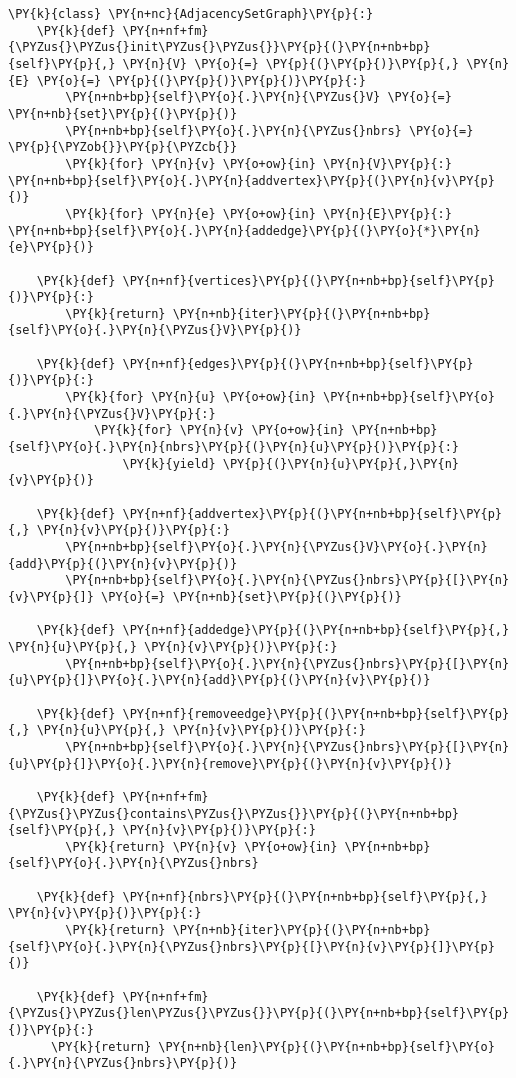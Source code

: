 \begin{Verbatim}[commandchars=\\\{\}]
\PY{k}{class} \PY{n+nc}{AdjacencySetGraph}\PY{p}{:}
    \PY{k}{def} \PY{n+nf+fm}{\PYZus{}\PYZus{}init\PYZus{}\PYZus{}}\PY{p}{(}\PY{n+nb+bp}{self}\PY{p}{,} \PY{n}{V} \PY{o}{=} \PY{p}{(}\PY{p}{)}\PY{p}{,} \PY{n}{E} \PY{o}{=} \PY{p}{(}\PY{p}{)}\PY{p}{)}\PY{p}{:}
        \PY{n+nb+bp}{self}\PY{o}{.}\PY{n}{\PYZus{}V} \PY{o}{=} \PY{n+nb}{set}\PY{p}{(}\PY{p}{)}
        \PY{n+nb+bp}{self}\PY{o}{.}\PY{n}{\PYZus{}nbrs} \PY{o}{=} \PY{p}{\PYZob{}}\PY{p}{\PYZcb{}}
        \PY{k}{for} \PY{n}{v} \PY{o+ow}{in} \PY{n}{V}\PY{p}{:} \PY{n+nb+bp}{self}\PY{o}{.}\PY{n}{addvertex}\PY{p}{(}\PY{n}{v}\PY{p}{)}
        \PY{k}{for} \PY{n}{e} \PY{o+ow}{in} \PY{n}{E}\PY{p}{:} \PY{n+nb+bp}{self}\PY{o}{.}\PY{n}{addedge}\PY{p}{(}\PY{o}{*}\PY{n}{e}\PY{p}{)}

    \PY{k}{def} \PY{n+nf}{vertices}\PY{p}{(}\PY{n+nb+bp}{self}\PY{p}{)}\PY{p}{:}
        \PY{k}{return} \PY{n+nb}{iter}\PY{p}{(}\PY{n+nb+bp}{self}\PY{o}{.}\PY{n}{\PYZus{}V}\PY{p}{)}

    \PY{k}{def} \PY{n+nf}{edges}\PY{p}{(}\PY{n+nb+bp}{self}\PY{p}{)}\PY{p}{:}
        \PY{k}{for} \PY{n}{u} \PY{o+ow}{in} \PY{n+nb+bp}{self}\PY{o}{.}\PY{n}{\PYZus{}V}\PY{p}{:}
            \PY{k}{for} \PY{n}{v} \PY{o+ow}{in} \PY{n+nb+bp}{self}\PY{o}{.}\PY{n}{nbrs}\PY{p}{(}\PY{n}{u}\PY{p}{)}\PY{p}{:}
                \PY{k}{yield} \PY{p}{(}\PY{n}{u}\PY{p}{,}\PY{n}{v}\PY{p}{)}

    \PY{k}{def} \PY{n+nf}{addvertex}\PY{p}{(}\PY{n+nb+bp}{self}\PY{p}{,} \PY{n}{v}\PY{p}{)}\PY{p}{:}
        \PY{n+nb+bp}{self}\PY{o}{.}\PY{n}{\PYZus{}V}\PY{o}{.}\PY{n}{add}\PY{p}{(}\PY{n}{v}\PY{p}{)}
        \PY{n+nb+bp}{self}\PY{o}{.}\PY{n}{\PYZus{}nbrs}\PY{p}{[}\PY{n}{v}\PY{p}{]} \PY{o}{=} \PY{n+nb}{set}\PY{p}{(}\PY{p}{)}

    \PY{k}{def} \PY{n+nf}{addedge}\PY{p}{(}\PY{n+nb+bp}{self}\PY{p}{,} \PY{n}{u}\PY{p}{,} \PY{n}{v}\PY{p}{)}\PY{p}{:}
        \PY{n+nb+bp}{self}\PY{o}{.}\PY{n}{\PYZus{}nbrs}\PY{p}{[}\PY{n}{u}\PY{p}{]}\PY{o}{.}\PY{n}{add}\PY{p}{(}\PY{n}{v}\PY{p}{)}

    \PY{k}{def} \PY{n+nf}{removeedge}\PY{p}{(}\PY{n+nb+bp}{self}\PY{p}{,} \PY{n}{u}\PY{p}{,} \PY{n}{v}\PY{p}{)}\PY{p}{:}
        \PY{n+nb+bp}{self}\PY{o}{.}\PY{n}{\PYZus{}nbrs}\PY{p}{[}\PY{n}{u}\PY{p}{]}\PY{o}{.}\PY{n}{remove}\PY{p}{(}\PY{n}{v}\PY{p}{)}

    \PY{k}{def} \PY{n+nf+fm}{\PYZus{}\PYZus{}contains\PYZus{}\PYZus{}}\PY{p}{(}\PY{n+nb+bp}{self}\PY{p}{,} \PY{n}{v}\PY{p}{)}\PY{p}{:}
        \PY{k}{return} \PY{n}{v} \PY{o+ow}{in} \PY{n+nb+bp}{self}\PY{o}{.}\PY{n}{\PYZus{}nbrs}

    \PY{k}{def} \PY{n+nf}{nbrs}\PY{p}{(}\PY{n+nb+bp}{self}\PY{p}{,} \PY{n}{v}\PY{p}{)}\PY{p}{:}
        \PY{k}{return} \PY{n+nb}{iter}\PY{p}{(}\PY{n+nb+bp}{self}\PY{o}{.}\PY{n}{\PYZus{}nbrs}\PY{p}{[}\PY{n}{v}\PY{p}{]}\PY{p}{)}

    \PY{k}{def} \PY{n+nf+fm}{\PYZus{}\PYZus{}len\PYZus{}\PYZus{}}\PY{p}{(}\PY{n+nb+bp}{self}\PY{p}{)}\PY{p}{:}
      \PY{k}{return} \PY{n+nb}{len}\PY{p}{(}\PY{n+nb+bp}{self}\PY{o}{.}\PY{n}{\PYZus{}nbrs}\PY{p}{)}
\end{Verbatim}



